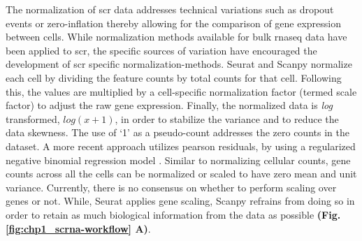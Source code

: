 
The normalization of \gls{scr} data addresses technical variations such as dropout events or zero-inflation thereby allowing for the comparison of gene expression between cells. While normalization methods available for bulk \gls{rnaseq} data have been applied to \gls{scr}, the specific sources of variation have encouraged the development of \gls{scr} specific normalization-methods. Seurat \textbf{\cite{butler_integrating_2018,stuart_comprehensive_2019,hao_integrated_2021}} and Scanpy \textbf{\cite{wolf_scanpy_2018}} normalize each cell by dividing the feature counts by total counts for that cell. Following this, the values are multiplied by a cell-specific normalization factor (termed scale factor) to adjust the raw gene expression. Finally, the normalized data is \textit{log} transformed, \begin{math}log(x+1)\end{math}, in order to stabilize the variance and to reduce the data skewness. The use of `1' as a pseudo-count addresses the zero counts in the dataset. A more recent approach utilizes pearson residuals, by using a regularized negative binomial regression model \textbf{\cite{hafemeister_normalization_2019}}. Similar to normalizing cellular counts, gene counts across all the cells can be normalized or scaled to have zero mean and unit variance. Currently, there is no consensus on whether to perform scaling over genes or not. While, Seurat \textbf{\cite{stuart_comprehensive_2019,hao_integrated_2021}} applies gene scaling, Scanpy \textbf{\cite{wolf_scanpy_2018}} refrains from doing so in order to retain as much biological information from the data as possible \textbf{(Fig. \ref{fig:chp1_scrna-workflow} A)}.

